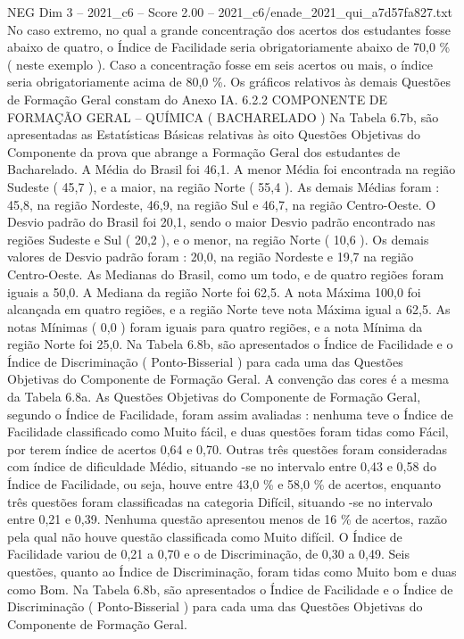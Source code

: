 \begin{textsample}{NEG Dim 3 – 2021\_c6 – Score 2.00 – 2021\_c6/enade\_2021\_qui\_a7d57fa827.txt}
No caso extremo, no qual a grande concentração dos acertos dos estudantes fosse abaixo de quatro, o Índice de Facilidade seria obrigatoriamente abaixo de 70,0 \% ( neste exemplo ).
Caso a concentração fosse em seis acertos ou mais, o índice seria obrigatoriamente acima de 80,0 \%.
Os gráficos relativos às demais Questões de Formação Geral constam do Anexo IA. 6.2.2 COMPONENTE DE FORMAÇÃO GERAL – QUÍMICA ( BACHARELADO ) Na Tabela 6.7b, são apresentadas as Estatísticas Básicas relativas às oito Questões Objetivas do Componente da prova que abrange a Formação Geral dos estudantes de Bacharelado.
A Média do Brasil foi 46,1.
A menor Média foi encontrada na região Sudeste ( 45,7 ), e a maior, na região Norte ( 55,4 ).
As demais Médias foram : 45,8, na região Nordeste, 46,9, na região Sul e 46,7, na região Centro-Oeste.
O Desvio padrão do Brasil foi 20,1, sendo o maior Desvio padrão encontrado nas regiões Sudeste e Sul ( 20,2 ), e o menor, na região Norte ( 10,6 ).
Os demais valores de Desvio padrão foram : 20,0, na região Nordeste e 19,7 na região Centro-Oeste.
As Medianas do Brasil, como um todo, e de quatro regiões foram iguais a 50,0.
A Mediana da região Norte foi 62,5.
A nota Máxima 100,0 foi alcançada em quatro regiões, e a região Norte teve nota Máxima igual a 62,5.
As notas Mínimas ( 0,0 ) foram iguais para quatro regiões, e a nota Mínima da região Norte foi 25,0.
Na Tabela 6.8b, são apresentados o Índice de Facilidade e o Índice de Discriminação ( Ponto-Bisserial ) para cada uma das Questões Objetivas do Componente de Formação Geral.
A convenção das cores é a mesma da Tabela 6.8a.
As Questões Objetivas do Componente de Formação Geral, segundo o Índice de Facilidade, foram assim avaliadas : nenhuma teve o Índice de Facilidade classificado como Muito fácil, e duas questões foram tidas como Fácil, por terem índice de acertos 0,64 e 0,70.
Outras três questões foram consideradas com índice de dificuldade Médio, situando -se no intervalo entre 0,43 e 0,58 do Índice de Facilidade, ou seja, houve entre 43,0 \% e 58,0 \% de acertos, enquanto três questões foram classificadas na categoria Difícil, situando -se no intervalo entre 0,21 e 0,39.
Nenhuma questão apresentou menos de 16 \% de acertos, razão pela qual não houve questão classificada como Muito difícil.
O Índice de Facilidade variou de 0,21 a 0,70 e o de Discriminação, de 0,30 a 0,49.
Seis questões, quanto ao Índice de Discriminação, foram tidas como Muito bom e duas como Bom.
Na Tabela 6.8b, são apresentados o Índice de Facilidade e o Índice de Discriminação ( Ponto-Bisserial ) para cada uma das Questões Objetivas do Componente de Formação Geral.

\end{textsample}
